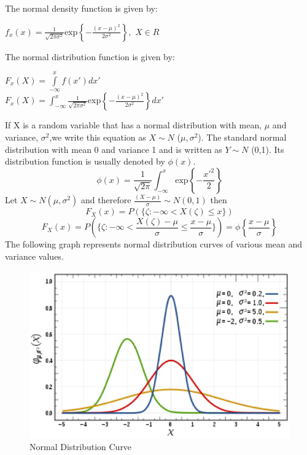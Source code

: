  The normal density function is given by:\\
\begin{center}
$f_x(x)=\frac{1}{\sqrt{2\pi\sigma^2}}\text{exp}\left\{-\frac{(x-\mu)^2}{2\sigma^2}\right\},$ \space\space\space  $X\in R$
\end{center}
The normal distribution function is given by:\\
\begin{center}$F_x(X)=\int\limits_{-\infty}^xf(x')dx'$\\
$F_x(X)=\int_{-\infty}^x\frac{1}{\sqrt{2\pi\sigma^2}}\text{exp}\left\{-\frac{(x-\mu)^2}{2\sigma^2}\right\}dx'$\end{center}
If X is a random variable that has a normal distribution with mean, $\mu$ and variance, $\sigma^2$,we write this equation as $X \sim N$ ($\mu, \sigma^2$). The standard normal distribution with mean 0 and variance 1 and is written as $Y\sim N$ (0,1). Its distribution function is usually denoted by $\phi(x)$.
$$\phi(x)=\frac{1}{\sqrt{2\pi}}\int_{-\infty}^x\text{exp}\left\{-\frac{x'^2}{2}\right\}$$
Let $X \sim N (\mu, \sigma^2)$ and therefore $\frac{(X-\mu)}{\sigma} \sim N(0,1)$ then
$$F_X(x)=P(\{\zeta: -\infty<X(\zeta)\leq x\})$$
$$F_X(x)=P(\{\zeta:-\infty<\frac{X(\zeta)-\mu}{\sigma}\leq \frac{x-\mu}{\sigma}\})=\phi\left\{\frac{x-\mu}{\sigma}\right\}$$
The following graph represents normal distribution curves of various mean and variance values.
\begin{figure}[H]
\begin{center}\includegraphics[scale=0.8]{fig13.png}\end{center}
\caption{Normal Distribution Curve}
\label{Normal Distribution Curve}
\end{figure}
 
